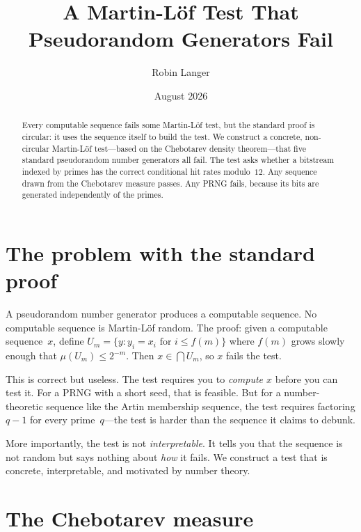 \documentclass[11pt]{article}
\title{\textbf{A Martin-L\"of Test That\\
Pseudorandom Generators Fail}}
\author{Robin Langer}
\date{August 2026}
\theoremstyle{definition}
\theoremstyle{remark}
\begin{document}
\maketitle

\begin{abstract}
Every computable sequence fails some Martin-L\"of test,
but the standard proof is circular:
it uses the sequence itself to build the test.
We construct a concrete, non-circular Martin-L\"of test---based
on the Chebotarev density theorem---that five standard
pseudorandom number generators all fail.
The test asks whether a bitstream indexed by primes
has the correct conditional hit rates modulo~$12$.
Any sequence drawn from the Chebotarev measure passes.
Any PRNG fails, because its bits are generated
independently of the primes.
\end{abstract}

\section{The problem with the standard proof}

A pseudorandom number generator produces a computable sequence.
No computable sequence is Martin-L\"of random.
The proof: given a computable sequence~$x$,
define $U_m = \{y : y_i = x_i \text{ for } i \leq f(m)\}$
where $f(m)$ grows slowly enough that $\mu(U_m) \leq 2^{-m}$.
Then $x \in \bigcap U_m$, so $x$ fails the test.

This is correct but useless.
The test requires you to \emph{compute $x$} before you can test it.
For a PRNG with a short seed, that is feasible.
But for a number-theoretic sequence like the Artin membership
sequence, the test requires factoring $q - 1$ for every prime~$q$---the
test is harder than the sequence it claims to debunk.

More importantly, the test is not \emph{interpretable}.
It tells you that the sequence is not random
but says nothing about \emph{how} it fails.
We construct a test that is concrete,
interpretable, and motivated by number theory.

\section{The Chebotarev measure}
\end{document}
